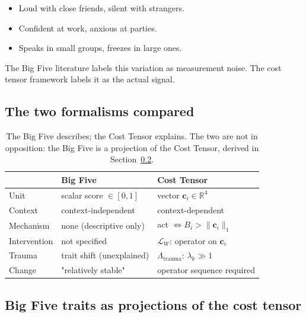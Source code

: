 \documentclass[12pt,a4paper]{article}
\begin{document}
\begin{itemize}[leftmargin=2em,itemsep=0.1em]
\item Loud with close friends, silent with strangers.
\item Confident at work, anxious at parties.
\item Speaks in small groups, freezes in large ones.
\end{itemize}

The Big Five literature labels this variation as measurement noise. The cost tensor framework labels it as the actual signal.

\subsection{The two formalisms compared}

\begin{table}[H]
\centering
\begin{tabular}{lll}
\toprule
                & Big Five                          & Cost Tensor                              \\ \midrule
Unit            & scalar score $\in [0,1]$          & vector $\mathbf{c}_i \in \mathbb{R}^4$  \\
Context         & context-independent               & context-dependent                        \\
Mechanism       & none (descriptive only)           & act $\Leftrightarrow B_i > \|\mathbf{c}_i\|_1$ \\
Intervention    & not specified                     & $\mathcal{L}_W$: operator on $\mathbf{c}_i$ \\
Trauma          & trait shift (unexplained)         & $\Lambda_{\mathrm{trauma}}$: $\lambda_k \gg 1$ \\
Change          & "relatively stable"             & operator sequence required               \\ \bottomrule
\end{tabular}
\caption{The Big Five describes; the Cost Tensor explains. The two are not in opposition: the Big Five is a projection of the Cost Tensor, derived in Section~\ref{sec:remap}.}
\label{tab:compare}
\end{table}

\subsection{Big Five traits as projections of the cost tensor}
\label{sec:remap}
\end{document}
